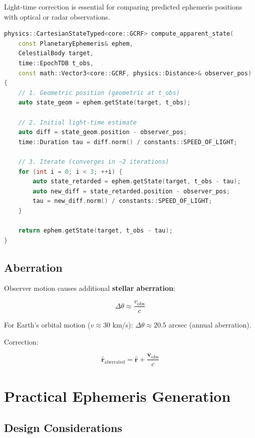 Light-time correction is essential for comparing predicted ephemeris positions with optical or radar observations.

\begin{lstlisting}[language=C++,caption={Type-safe Light-time correction}]
physics::CartesianStateTyped<core::GCRF> compute_apparent_state(
    const PlanetaryEphemeris& ephem,
    CelestialBody target,
    time::EpochTDB t_obs,
    const math::Vector3<core::GCRF, physics::Distance>& observer_pos)
{
    // 1. Geometric position (geometric at t_obs)
    auto state_geom = ephem.getState(target, t_obs);
    
    // 2. Initial light-time estimate
    auto diff = state_geom.position - observer_pos;
    time::Duration tau = diff.norm() / constants::SPEED_OF_LIGHT;
    
    // 3. Iterate (converges in ~2 iterations)
    for (int i = 0; i < 3; ++i) {
        auto state_retarded = ephem.getState(target, t_obs - tau);
        auto new_diff = state_retarded.position - observer_pos;
        tau = new_diff.norm() / constants::SPEED_OF_LIGHT;
    }
    
    return ephem.getState(target, t_obs - tau);
}
\end{lstlisting}

\subsection{Aberration}

Observer motion causes additional \textbf{stellar aberration}:

\begin{equation}
    \Delta\theta \approx \frac{v_{\text{obs}}}{c}
\end{equation}

For Earth's orbital motion ($v \approx 30$ km/s): $\Delta\theta \approx 20.5$ arcsec (annual aberration).

Correction:

\begin{equation}
    \hat{\mathbf{r}}_{\text{aberrated}} = \hat{\mathbf{r}} + \frac{\mathbf{v}_{\text{obs}}}{c}
\end{equation}

\section{Practical Ephemeris Generation}

\subsection{Design Considerations}

